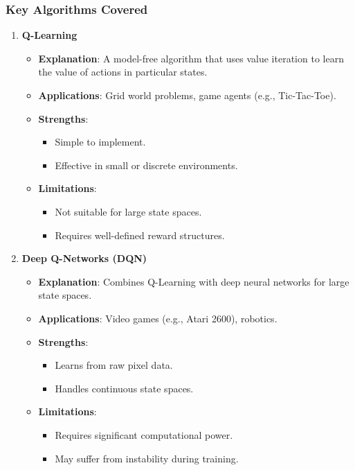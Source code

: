 \documentclass[aspectratio=169]{beamer}
\begin{document}
\begin{frame}[fragile]
    \frametitle{Key Algorithms Covered}
    \begin{enumerate}
        \item \textbf{Q-Learning}
            \begin{itemize}
                \item \textbf{Explanation}: A model-free algorithm that uses value iteration to learn the value of actions in particular states.
                \item \textbf{Applications}: Grid world problems, game agents (e.g., Tic-Tac-Toe).
                \item \textbf{Strengths}:
                    \begin{itemize}
                        \item Simple to implement.
                        \item Effective in small or discrete environments.
                    \end{itemize}
                \item \textbf{Limitations}:
                    \begin{itemize}
                        \item Not suitable for large state spaces.
                        \item Requires well-defined reward structures.
                    \end{itemize}
            \end{itemize}
        
        \item \textbf{Deep Q-Networks (DQN)}
            \begin{itemize}
                \item \textbf{Explanation}: Combines Q-Learning with deep neural networks for large state spaces.
                \item \textbf{Applications}: Video games (e.g., Atari 2600), robotics.
                \item \textbf{Strengths}:
                    \begin{itemize}
                        \item Learns from raw pixel data.
                        \item Handles continuous state spaces.
                    \end{itemize}
                \item \textbf{Limitations}:
                    \begin{itemize}
                        \item Requires significant computational power.
                        \item May suffer from instability during training.
                    \end{itemize}
            \end{itemize}
    \end{enumerate}
\end{frame}
\end{document}

